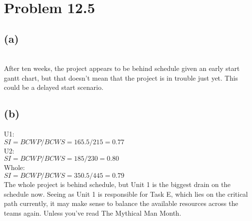 \documentclass{article}
\begin{document}
	\section*{Problem 12.5}
	\subsection*{(a)}
	
	\\
	After ten weeks, the project appears to be behind schedule given an early start gantt chart, but that doesn't mean that the project is in trouble just yet. This could be a delayed start scenario.
	
	\subsection*{(b)}
	U1:\\
	$SI = BCWP/BCWS = 165.5/215 = 0.77$\\
	U2:\\
	$SI = BCWP/BCWS = 185/230 = 0.80$\\
	Whole:\\
	$SI = BCWP/BCWS = 350.5/445 = 0.79$\\
	
	The whole project is behind schedule, but Unit 1 is the biggest drain on the schedule now. Seeing as Unit 1 is responsible for Task E, which lies on the critical path currently, it may make sense to balance the available resources across the teams again. Unless you've read The Mythical Man Month.
\end{document}

